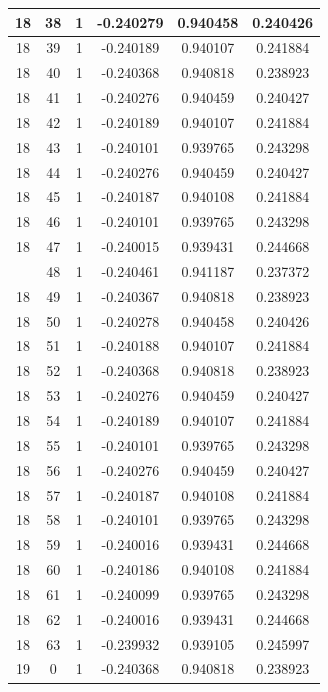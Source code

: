 \documentclass[12pt,a4paper]{article}
\numberwithin{equation}{section}
\numberwithin{figure}{section}
\numberwithin{table}{section}
\begin{document}
\begin{longtable}{|c|c|c|c|c|c|}
18 & 38 & 1 & -0.240279 & 0.940458 & 0.240426 \\ \hline
18 & 39 & 1 & -0.240189 & 0.940107 & 0.241884 \\ \hline
18 & 40 & 1 & -0.240368 & 0.940818 & 0.238923 \\ \hline
18 & 41 & 1 & -0.240276 & 0.940459 & 0.240427 \\ \hline
18 & 42 & 1 & -0.240189 & 0.940107 & 0.241884 \\ \hline
18 & 43 & 1 & -0.240101 & 0.939765 & 0.243298 \\ \hline
18 & 44 & 1 & -0.240276 & 0.940459 & 0.240427 \\ \hline
18 & 45 & 1 & -0.240187 & 0.940108 & 0.241884 \\ \hline
18 & 46 & 1 & -0.240101 & 0.939765 & 0.243298 \\ \hline
18 & 47 & 1 & -0.240015 & 0.939431 & 0.244668 \\ \hline
\pagebreak
18 & 48 & 1 & -0.240461 & 0.941187 & 0.237372 \\ \hline
18 & 49 & 1 & -0.240367 & 0.940818 & 0.238923 \\ \hline
18 & 50 & 1 & -0.240278 & 0.940458 & 0.240426 \\ \hline
18 & 51 & 1 & -0.240188 & 0.940107 & 0.241884 \\ \hline
18 & 52 & 1 & -0.240368 & 0.940818 & 0.238923 \\ \hline
18 & 53 & 1 & -0.240276 & 0.940459 & 0.240427 \\ \hline
18 & 54 & 1 & -0.240189 & 0.940107 & 0.241884 \\ \hline
18 & 55 & 1 & -0.240101 & 0.939765 & 0.243298 \\ \hline
18 & 56 & 1 & -0.240276 & 0.940459 & 0.240427 \\ \hline
18 & 57 & 1 & -0.240187 & 0.940108 & 0.241884 \\ \hline
18 & 58 & 1 & -0.240101 & 0.939765 & 0.243298 \\ \hline
18 & 59 & 1 & -0.240016 & 0.939431 & 0.244668 \\ \hline
18 & 60 & 1 & -0.240186 & 0.940108 & 0.241884 \\ \hline
18 & 61 & 1 & -0.240099 & 0.939765 & 0.243298 \\ \hline
18 & 62 & 1 & -0.240016 & 0.939431 & 0.244668 \\ \hline
18 & 63 & 1 & -0.239932 & 0.939105 & 0.245997 \\ \hline
19 & 0 & 1 & -0.240368 & 0.940818 & 0.238923 \\ \hline

\end{longtable}
\end{document}
